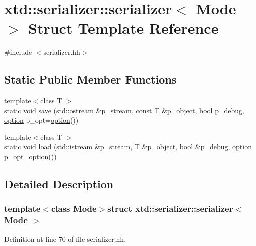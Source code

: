 \hypertarget{structxtd_1_1serializer_1_1serializer}{\section{xtd\-:\-:serializer\-:\-:serializer$<$ Mode $>$ Struct Template Reference}
\label{structxtd_1_1serializer_1_1serializer}
}


{\ttfamily \#include $<$serializer.\-hh$>$}

\subsection*{Static Public Member Functions}
\begin{DoxyCompactItemize}
\item 
{\footnotesize template$<$class T $>$ }\\static void \hyperlink{structxtd_1_1serializer_1_1serializer_a3e2f6195fd27da1f10e131facc8e017f}{save} (std\-::ostream \&p\-\_\-stream, const T \&p\-\_\-object, bool p\-\_\-debug, \hyperlink{structxtd_1_1serializer_1_1option}{option} p\-\_\-opt=\hyperlink{structxtd_1_1serializer_1_1option}{option}())
\item 
{\footnotesize template$<$class T $>$ }\\static void \hyperlink{structxtd_1_1serializer_1_1serializer_ac8fd960ff27c165ad77f657f685add30}{load} (std\-::istream \&p\-\_\-stream, T \&p\-\_\-object, bool \&p\-\_\-debug, \hyperlink{structxtd_1_1serializer_1_1option}{option} p\-\_\-opt=\hyperlink{structxtd_1_1serializer_1_1option}{option}())
\end{DoxyCompactItemize}


\subsection{Detailed Description}
\subsubsection*{template$<$class Mode$>$struct xtd\-::serializer\-::serializer$<$ Mode $>$}



Definition at line 70 of file serializer.\-hh.



